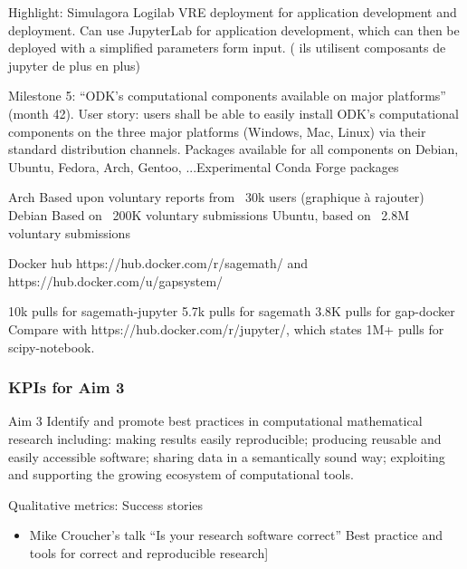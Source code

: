 \begin{Aim 1}
\begin{Aim 2}
Highlight: Simulagora
Logilab VRE deployment for application development and deployment.
Can use JupyterLab for application development, which can then be deployed 
with a simplified parameters form input. ( ils utilisent composants de jupyter de plus en plus)


Milestone 5: “ODK’s computational components available on major platforms” (month 42).
       User story: users shall be able to easily install ODK’s computational components on the three major platforms (Windows, Mac, Linux)
       via their standard distribution channels.
       Packages available for all components on Debian, Ubuntu, Fedora, Arch, Gentoo, ...Experimental Conda Forge packages
      
      Arch Based upon voluntary reports from ~30k users (graphique à rajouter)
      Debian Based on ~200K voluntary submissions
      Ubuntu, based on ~2.8M voluntary submissions
      
      Docker hub https://hub.docker.com/r/sagemath/ and https://hub.docker.com/u/gapsystem/

          10k pulls for sagemath-jupyter
          5.7k pulls for sagemath
          3.8K pulls for gap-docker
Compare with https://hub.docker.com/r/jupyter/, which states 1M+ pulls for scipy-notebook.
 

\subsubsection{KPIs for Aim 3}

\begin{recommendation}{Aim 3}
  Identify and promote best practices in computational mathematical research including: making results easily reproducible; producing
  reusable and easily accessible software; sharing data in a semantically sound way; exploiting and supporting the growing
  ecosystem of computational tools.
\end{recommendation}

Qualitative metrics: Success stories
\begin{itemize}
\item Mike Croucher's talk ``Is your research software correct''
Best practice and tools for correct and reproducible research]
         

\end{itemize}
\end{Aim 2}
\end{Aim 1}
